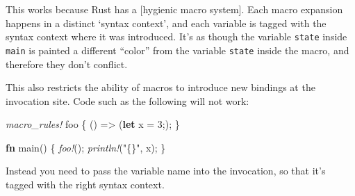 \documentclass[a4paper,]{book}
\newenvironment{Shaded}{\begin{snugshade}}{\end{snugshade}}
\newcommand{\KeywordTok}[1]{\textcolor[rgb]{0.13,0.29,0.53}{\textbf{{#1}}}}
\newcommand{\DataTypeTok}[1]{\textcolor[rgb]{0.13,0.29,0.53}{{#1}}}
\newcommand{\DecValTok}[1]{\textcolor[rgb]{0.00,0.00,0.81}{{#1}}}
\newcommand{\StringTok}[1]{\textcolor[rgb]{0.31,0.60,0.02}{{#1}}}
\newcommand{\PreprocessorTok}[1]{\textcolor[rgb]{0.56,0.35,0.01}{\textit{{#1}}}}
\newcommand{\NormalTok}[1]{{#1}}
\begin{document}
\begin{Shaded}
\end{Shaded}

This works because Rust has a {[}hygienic macro system{]}. Each macro
expansion happens in a distinct `syntax context', and each variable is
tagged with the syntax context where it was introduced. It's as though
the variable \texttt{state} inside \texttt{main} is painted a different
``color'' from the variable \texttt{state} inside the macro, and
therefore they don't conflict.

This also restricts the ability of macros to introduce new bindings at
the invocation site. Code such as the following will not work:

\begin{Shaded}
\begin{Highlighting}[]
\PreprocessorTok{macro_rules!} \NormalTok{foo \{}
    \NormalTok{() => (}\KeywordTok{let} \NormalTok{x = }\DecValTok{3}\NormalTok{;);}
\NormalTok{\}}

\KeywordTok{fn} \NormalTok{main() \{}
    \PreprocessorTok{foo!}\NormalTok{();}
    \PreprocessorTok{println!}\NormalTok{(}\StringTok{"\{\}"}\NormalTok{, x);}
\NormalTok{\}}
\end{Highlighting}
\end{Shaded}

Instead you need to pass the variable name into the invocation, so that
it's tagged with the right syntax context.

\begin{Shaded}
\end{Shaded}
\end{document}
